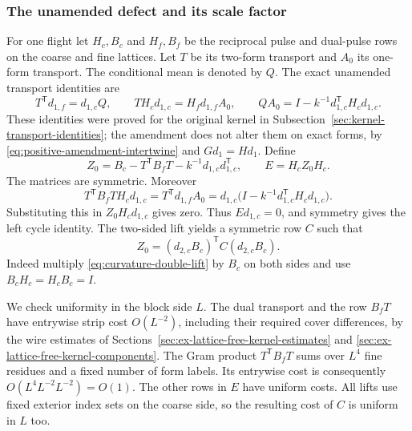 \subsubsection{The unamended defect and its scale factor}
For one flight let $H_c,B_c$ and $H_f,B_f$ be the reciprocal
pulse and dual-pulse rows on the coarse and fine lattices.
Let $T$ be its two-form transport and $A_0$ its one-form
transport. The conditional mean is denoted by $Q$. The exact
unamended transport identities are
\begin{equation}\label{eq:curvature-tangent}
 T^{\mathsf T}d_{1,f}=d_{1,c}Q,\qquad
 TH_cd_{1,c}=H_fd_{1,f}A_0,\qquad
 QA_0=I-k^{-1}d_{1,c}^{\mathsf T}H_cd_{1,c}.
\end{equation}
These identities were proved for the original kernel in
Subsection~\ref{sec:kernel-transport-identities};
the amendment does not alter them on exact forms, by
\eqref{eq:positive-amendment-intertwine} and $Gd_1=Hd_1$.
Define
\[
 Z_0=B_c-T^{\mathsf T}B_fT-k^{-1}d_{1,c}d_{1,c}^{\mathsf T},
                        \qquad E=H_c Z_0 H_c.
\]
The matrices are symmetric. Moreover
\[
 T^{\mathsf T}B_fT H_cd_{1,c}
       =T^{\mathsf T}d_{1,f}A_0
       =d_{1,c}\bigl(I-k^{-1}d_{1,c}^{\mathsf T}H_cd_{1,c}\bigr).
\]
Substituting this in $Z_0H_cd_{1,c}$ gives zero. Thus
$Ed_{1,c}=0$, and symmetry gives the left cycle identity.
The two-sided lift yields a symmetric row $C$ such that
\begin{equation}\label{eq:curvature-unamended-factor}
 Z_0=(d_{2,c}B_c)^{\mathsf T}C(d_{2,c}B_c).
\end{equation}
Indeed multiply \eqref{eq:curvature-double-lift} by $B_c$ on
both sides and use $B_cH_c=H_cB_c=I$.

We check uniformity in the block side $L$. The dual transport
and the row $B_fT$ have entrywise strip cost $O(L^{-2})$,
including their required cover differences, by the wire estimates
of Sections~\ref{sec:ex-lattice-free-kernel-estimates} and
\ref{sec:ex-lattice-free-kernel-components}. The Gram product
$T^{\mathsf T}B_fT$ sums over $L^4$ fine residues and a fixed
number of form labels. Its entrywise cost is consequently
$O(L^4 L^{-2}L^{-2})=O(1)$. The other rows in $E$ have uniform
costs. All lifts use fixed exterior index sets on the coarse
side, so the resulting cost of $C$ is uniform in $L$ too.

